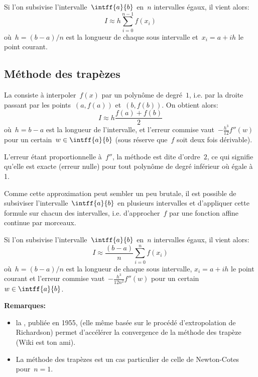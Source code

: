 Si l'on subsivise l'intervalle~$\intff{a}{b}$ en~$n$ intervalles égaux, il vient alors:
\begin{equation}I\approx h\sum_{i=0}^{n-1} f(x_i)\end{equation}
où~$h=(b-a)/n$ est la longueur de chaque sous intervalle et~$x_i=a+ih$ le
point courant.




\medskip
\subsection*{Méthode des trapèzes}

La  consiste à interpoler~$f(x)$ par un polynôme 
de degré~$1$, i.e. par la droite passant par les points~$(a,f(a))$ et~$(b,f(b))$.
On obtient alors:
\begin{equation} I\approx h\dfrac{f(a)+f(b)}2\end{equation}
où~$h=b-a$ est la longueur de l'intervalle,
et l'erreur commise vaut~$-\frac{h^3}{12} f''(w)$ pour un certain~$w\in\intff{a}{b}$
(sous réserve que~$f$ soit deux fois dérivable).

L'erreur étant proportionnelle à~$f''$, la méthode est dite d'ordre~$2$, ce qui
signifie qu'elle est exacte (erreur nulle) pour tout polynôme de degré inférieur
où égale à 1.

\medskip
Comme cette approximation peut sembler un peu brutale, il est possible de subsiviser
l'intervalle~$\intff{a}{b}$ en plusieurs intervalles et d'appliquer cette formule sur chacun
des intervalles, i.e. d'approcher~$f$ par une fonction affine continue par morceaux.

Si l'on subsivise l'intervalle~$\intff{a}{b}$ en~$n$ intervalles égaux, il vient alors:
\begin{equation}I\approx \frac{(b-a)}{n}\sum_{i=0}^{n}f(x_i)\end{equation}
où~$h=(b-a)/n$ est la longueur de chaque sous intervalle, $x_i=a+ih$ le
point courant et l'erreur commise vaut~$-\frac{h^3}{12n^2} f''(w)$ pour un certain~$w\in\intff{a}{b}$.

\medskip
\textbf{Remarques:}
\begin{itemize}
\item la , publiée en 1955,
(elle même basée sur le procédé d'extropolation de Richardson)
permet d'accélérer la convergence de la méthode des trapèze (Wiki est ton ami).
\item La méthode des trapèzes est un cas particulier de celle de Newton-Cotes pour~$n=1$.
\end{itemize}

